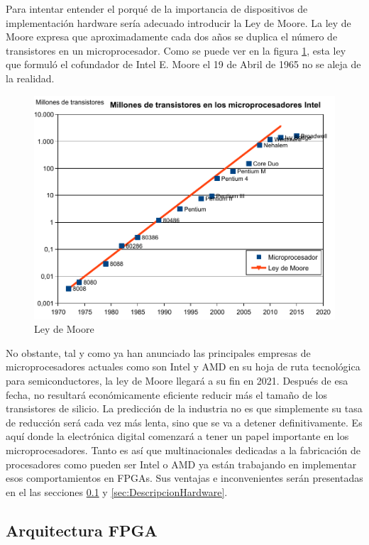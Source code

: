 Para intentar entender el porqué de la importancia de dispositivos de implementación hardware sería adecuado introducir la Ley de Moore. La ley de Moore expresa que aproximadamente cada dos años se duplica el número de transistores en un microprocesador. Como se puede ver en la figura \ref{fig:Ley_de_Moore}, esta ley que formuló el cofundador de Intel E. Moore el 19 de Abril de 1965 no se aleja de la realidad.
\newline
\begin{figure}[H]
	\center
	\includegraphics[scale=0.7]{imagenes/EstadoArte/ley_moore-eps-converted-to.pdf}
	\caption{Ley de Moore}
	\label{fig:Ley_de_Moore}
\end{figure}
 

No obstante, tal y como ya han anunciado las principales empresas de microprocesadores actuales como son Intel y AMD en su hoja de ruta tecnológica para semiconductores, la ley de Moore llegará a su fin en 2021. Después de esa fecha, no resultará económicamente eficiente reducir más el tamaño de los transistores de silicio. La predicción de la industria no es que simplemente su tasa de reducción será cada vez más lenta, sino que se va a detener definitivamente. Es aquí donde la electrónica digital comenzará a tener un papel importante en los microprocesadores. Tanto es así que multinacionales dedicadas a la fabricación de procesadores como pueden ser Intel o AMD ya están trabajando en implementar esos comportamientos en FPGAs. Sus ventajas e inconvenientes serán presentadas en el las secciones \ref{sec:ArquitecturaFPGA} y \ref{sec:DescripcionHardware}.

\subsection{Arquitectura FPGA}\label{sec:ArquitecturaFPGA}

